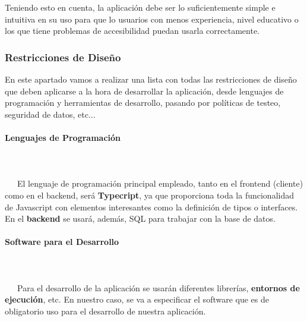 Teniendo esto en cuenta, la aplicación debe ser lo suficientemente simple e intuitiva en su uso para que lo usuarios con menos experiencia, nivel educativo o los que tiene problemas de accesibilidad puedan usarla correctamente.

\subsubsection{Restricciones de Diseño}
En este apartado vamos a realizar una lista con todas las restricciones de diseño que deben aplicarse a la hora de desarrollar la aplicación, desde lenguajes de programación y herramientas de desarrollo, pasando por políticas de testeo, seguridad de datos, etc...

\paragraph{Lenguajes de Programación}
~\\\\
\-\ \-\ \-\ El lenguaje de programación principal empleado, tanto en el \gls{frontend} (cliente) como en el \gls{backend}, será \textbf{Typecript}, ya que proporciona toda la funcionalidad de Javascript con elementos interesantes como la definición de tipos o interfaces. En el \textbf{backend} se usará, además, \gls{SQL} para trabajar con la base de datos.

\paragraph{Software para el Desarrollo}
~\\\\
\-\ \-\ \-\ Para el desarrollo de la aplicación se usarán diferentes \gls{librerías}, \textbf{entornos de ejecución}, etc. En nuestro caso, se va a especificar el software que es de obligatorio uso para el desarrollo de nuestra aplicación. 

